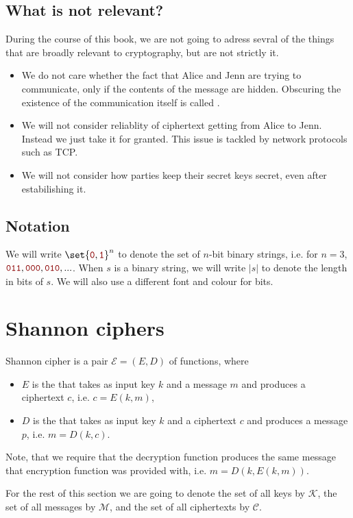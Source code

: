 \documentclass[a4paper,10pt]{article}
\newcommand{\cll}[1]{\mathcal{#1}}
\newcommand{\mtt}[1]{{\color{darkred} \mathtt{#1}}}
\begin{document}
\subsection*{What is not relevant?}
During the course of this book, we are not going to adress sevral of the things
that are broadly relevant to cryptography, but are not strictly it.

\begin{itemize}
\item  We do not care whether the fact that Alice and Jenn are trying to
  communicate, only if the contents of the message are hidden. Obscuring the
  existence of the communication itself is called .
\item We will not consider reliablity of ciphertext getting from Alice to Jenn.
  Instead we just take it for granted. This issue is tackled by network
  protocols such as TCP.
\item We will not consider how parties keep their secret keys secret, even
  after estabilishing it.
\end{itemize}

\subsection*{Notation}
We will write $\set{\mtt{0},\mtt{1}}^n$ to denote the set of $n$-bit binary strings, i.e.
for $n = 3$, $\mtt{011}, \mtt{000}, \mtt{010}, ...$. When $s$ is a binary string, we will write
$|s|$ to denote the length in bits of $s$. We will also use a different font and
colour for bits.

\section{Shannon ciphers}
Shannon cipher is a pair $\cll{E} = (E, D)$ of functions, where
\begin{itemize}
\item $E$ is the  that takes as input key $k$ and a
  message $m$ and produces a ciphertext $c$, i.e. $c = E(k,m)$,
\item $D$ is the  that takes as input key $k$ and a
  ciphertext $c$ and produces a message $p$, i.e. $m = D(k,c)$.
\end{itemize}
Note, that we require that the decryption function produces the same message
that encryption function was provided with, i.e. $m = D(k, E(k, m))$.

For the rest of this section we are going to denote the set of all keys by $\cll{K}$,
the set of all messages by $\cll{M}$, and the set of all ciphertexts by $\cll{C}$.
\end{document}
